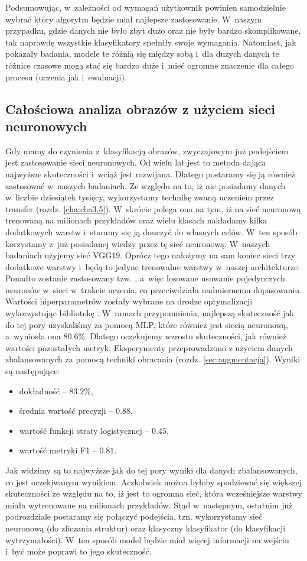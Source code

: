 Podsumowując, w~zależności od wymagań użytkownik powinien samodzielnie wybrać który algorytm będzie miał najlepsze zastosowanie. W~naszym przypadku, gdzie danych nie było zbyt dużo oraz nie były bardzo skomplikowane, tak naprawdę wszystkie klasyfikatory spełniły swoje wymagania. Natomiast, jak pokazały badania, modele te różnią się między sobą i~dla dużych danych te różnice czasowe mogą stać się bardzo duże i~mieć ogromne znaczenie dla całego procesu (uczenia jak i~ewaluacji).

\subsection{Całościowa analiza obrazów z użyciem sieci neuronowych}
\label{binary.ann.with.structures}

Gdy mamy do czynienia z~klasyfikacją obrazów, zwyczajowym już podejściem jest zastosowanie sieci neuronowych. Od wielu lat jest to metoda dająca najwyższe skuteczności i~wciąż jest rozwijana. Dlatego postaramy się ją również zastosować w~naszych badaniach. Ze względu na to, iż nie posiadamy danych w~liczbie dziesiątek tysięcy, wykorzystamy technikę zwaną uczeniem przez transfer (rozdz. \ref{cha:cha3.5}). W~skrócie polega ona na tym, iż na sieć neuronową trenowaną na milionach przykładów oraz wielu klasach nakładamy kilka dodatkowych warstw i~staramy się ją douczyć do własnych celów. W~ten sposób korzystamy z~już posiadanej wiedzy przez tę sieć neuronową. W~naszych badaniach użyjemy sieć VGG19. Oprócz tego nałożymy na sam koniec sieci trzy dodatkowe warstwy i~będą to jedyne trenowalne warstwy w~naszej architekturze. Ponadto zostanie zastosowany tzw. , a~więc losowane usuwanie pojedynczych neuronów w~sieci w~trakcie uczenia, co przeciwdziała nadmiernemu dopasowaniu. Wartości hiperparametrów zostały wybrane na drodze optymalizacji wykorzystując bibliotekę . W~ramach przypomnienia, najlepszą skuteczność jak do tej pory uzyskaliśmy za pomocą MLP, które również jest siecią neuronową, a~wyniosła ona $80.6\%$. Dlatego oczekujemy wzrostu skuteczności, jak również wartości pozostałych metryk. 
Eksperymenty przeprowadzono z użyciem danych zbalansowanych za pomocą techniki obracania (rozdz. \ref{sec:augmentacja}). Wyniki są następujące:
\begin{itemize}
	\item dokładność – $83.2\%$,
	\item średnia wartość precyzji – $0.88$,
	\item wartość funkcji straty logistycznej – $0.45$,
	\item wartość metryki F1 – $0.81$.
\end{itemize}
Jak widzimy są to najwyższe jak do tej pory wyniki dla danych zbalansowanych, co jest oczekiwanym wynikiem. Aczkolwiek można byłoby spodziewać się większej skuteczności ze względu na to, iż jest to ogromna sieć, która wcześniejsze warstwy miała wytrenowane na milionach przykładów. Stąd w~następnym, ostatnim już podrozdziale postaramy się połączyć podejścia, tzn. wykorzystamy sieć neuronową (do zliczania struktur) oraz klasyczny klasyfikator (do klasyfikacji wytrzymałości). W~ten sposób model będzie miał więcej informacji na wejściu i~być może poprawi to jego skuteczność. 


